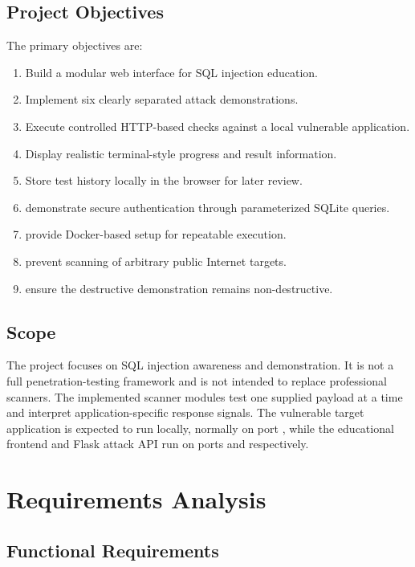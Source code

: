 \documentclass[12pt,a4paper]{article}
\newcommand{\code}[1]{\texttt{\detokenize{#1}}}
\begin{document}
\subsection{Project Objectives}

The primary objectives are:

\begin{enumerate}[leftmargin=1.4cm]
    \item Build a modular web interface for SQL injection education.
    \item Implement six clearly separated attack demonstrations.
    \item Execute controlled HTTP-based checks against a local vulnerable application.
    \item Display realistic terminal-style progress and result information.
    \item Store test history locally in the browser for later review.
    \item demonstrate secure authentication through parameterized SQLite queries.
    \item provide Docker-based setup for repeatable execution.
    \item prevent scanning of arbitrary public Internet targets.
    \item ensure the destructive demonstration remains non-destructive.
\end{enumerate}

\subsection{Scope}

The project focuses on SQL injection awareness and demonstration. It is not a full penetration-testing framework and is not intended to replace professional scanners. The implemented scanner modules test one supplied payload at a time and interpret application-specific response signals. The vulnerable target application is expected to run locally, normally on port \code{2000}, while the educational frontend and Flask attack API run on ports \code{3000} and \code{5000} respectively.

\section{Requirements Analysis}

\subsection{Functional Requirements}
\end{document}
